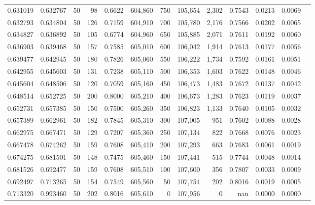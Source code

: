 \begin{tabular}{rrrrrrrrrrrrr}
0.631019 & 0.632767 &    50 &  98 &                                     0.6622 & 604,860 &     750 & 105,654 &   2,302 & 0.7543 & 0.0213 & 0.0069 \\
0.632793 & 0.634804 &    50 & 126 &                                     0.7159 & 604,910 &     700 & 105,780 &   2,176 & 0.7566 & 0.0202 & 0.0065 \\
0.634827 & 0.636892 &    50 & 105 &                                     0.6774 & 604,960 &     650 & 105,885 &   2,071 & 0.7611 & 0.0192 & 0.0060 \\
0.636903 & 0.639468 &    50 & 157 &                                     0.7585 & 605,010 &     600 & 106,042 &   1,914 & 0.7613 & 0.0177 & 0.0056 \\
0.639477 & 0.642945 &    50 & 180 &                                     0.7826 & 605,060 &     550 & 106,222 &   1,734 & 0.7592 & 0.0161 & 0.0051 \\
0.642955 & 0.645603 &    50 & 131 &                                     0.7238 & 605,110 &     500 & 106,353 &   1,603 & 0.7622 & 0.0148 & 0.0046 \\
0.645604 & 0.648506 &    50 & 120 &                                     0.7059 & 605,160 &     450 & 106,473 &   1,483 & 0.7672 & 0.0137 & 0.0042 \\
0.648514 & 0.652725 &    50 & 200 &                                     0.8000 & 605,210 &     400 & 106,673 &   1,283 & 0.7623 & 0.0119 & 0.0037 \\
0.652731 & 0.657385 &    50 & 150 &                                     0.7500 & 605,260 &     350 & 106,823 &   1,133 & 0.7640 & 0.0105 & 0.0032 \\
0.657389 & 0.662961 &    50 & 182 &                                     0.7845 & 605,310 &     300 & 107,005 &     951 & 0.7602 & 0.0088 & 0.0028 \\
0.662975 & 0.667471 &    50 & 129 &                                     0.7207 & 605,360 &     250 & 107,134 &     822 & 0.7668 & 0.0076 & 0.0023 \\
0.667478 & 0.674262 &    50 & 159 &                                     0.7608 & 605,410 &     200 & 107,293 &     663 & 0.7683 & 0.0061 & 0.0019 \\
0.674275 & 0.681501 &    50 & 148 &                                     0.7475 & 605,460 &     150 & 107,441 &     515 & 0.7744 & 0.0048 & 0.0014 \\
0.681526 & 0.692477 &    50 & 159 &                                     0.7608 & 605,510 &     100 & 107,600 &     356 & 0.7807 & 0.0033 & 0.0009 \\
0.692497 & 0.713265 &    50 & 154 &                                     0.7549 & 605,560 &      50 & 107,754 &     202 & 0.8016 & 0.0019 & 0.0005 \\
0.713320 & 0.993460 &    50 & 202 &                                     0.8016 & 605,610 &       0 & 107,956 &       0 &    nan & 0.0000 & 0.0000 \\
\bottomrule
\end{tabular}

